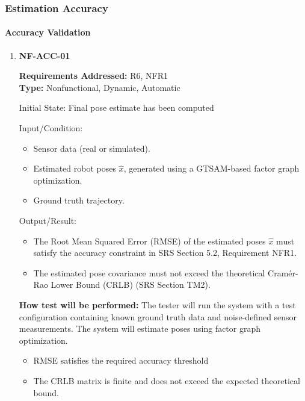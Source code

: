\documentclass[12pt, titlepage]{article}
\begin{document}


\subsubsection{Estimation Accuracy}
		
\paragraph{Accuracy Validation}

\begin{enumerate}

\item{\textbf{NF-ACC-01}}

\textbf{Requirements Addressed:} R6, NFR1\\
\textbf{Type:} Nonfunctional, Dynamic, Automatic
					
Initial State: Final pose estimate has been computed
					
Input/Condition: 
\begin{itemize}
  \item Sensor data (real or simulated).
  \item Estimated robot poses $\hat{x}$, generated using a GTSAM-based factor graph optimization.
  \item Ground truth trajectory.
\end{itemize}
					
Output/Result: 
\begin{itemize}
  \item The Root Mean Squared Error (RMSE) of the estimated poses $\hat{x}$ must satisfy the accuracy constraint in SRS Section 5.2, Requirement NFR1.
  \item The estimated pose covariance must not exceed the theoretical Cram\'er-Rao Lower Bound (CRLB) (SRS Section TM2).
\end{itemize}
					
\textbf{How test will be performed:} The tester will run the system with a test configuration containing known ground truth data and noise-defined sensor measurements. The system will estimate poses using factor graph optimization.
\begin{itemize}
  \item RMSE satisfies the required accuracy threshold
  \item The CRLB matrix is finite and does not exceed the expected theoretical bound.
\end{itemize}

\end{enumerate}
\end{document}
